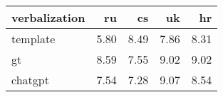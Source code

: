 \begin{tabular}{|l|rrrr|}
\hline
 verbalization   &   ru &   cs &   uk &   hr \\
\hline
 template        & 5.80 & 8.49 & 7.86 & 8.31 \\
 gt              & 8.59 & 7.55 & 9.02 & 9.02 \\
 chatgpt         & 7.54 & 7.28 & 9.07 & 8.54 \\
\hline
\end{tabular}
